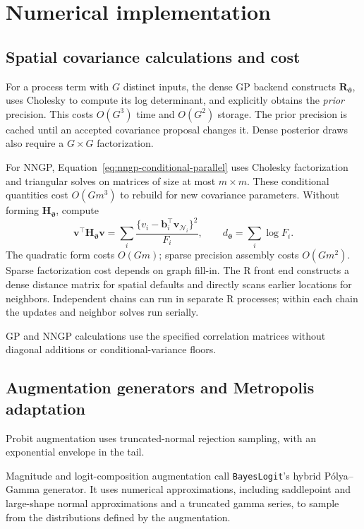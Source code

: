 \documentclass[11pt]{article}
\newcommand{\bb}{\bm{b}}
\newcommand{\bv}{\bm{v}}
\newcommand{\bR}{\bm{R}}
\newcommand{\bH}{\bm{H}}
\newcommand{\trans}{^\top}
\begin{document}
\section{Numerical implementation}
\label{sec:numerical-sampling}

\subsection{Spatial covariance calculations and cost}

For a process term with \(G\) distinct inputs, the dense GP backend
constructs \(\bR_{\boldsymbol\vartheta}\), uses Cholesky to compute its
log determinant, and explicitly obtains the \emph{prior} precision.
This costs \(O(G^3)\) time and \(O(G^2)\) storage.
The prior precision is cached until an accepted covariance proposal changes it.
Dense posterior draws also require a \(G\times G\) factorization.

For NNGP, Equation~\ref{eq:nngp-conditional-parallel} uses Cholesky
factorization and triangular solves on matrices of size at most
\(m\times m\). These conditional quantities cost \(O(Gm^3)\) to rebuild
for new covariance parameters. Without forming \(\bH_{\boldsymbol\vartheta}\), compute
\begin{equation}
 \bv\trans\bH_{\boldsymbol\vartheta}\bv
   =\sum_i\frac{\{v_i-\bb_i\trans\bv_{\mathcal N_i}\}^2}{F_i},
 \qquad d_{\boldsymbol\vartheta}=\sum_i\log F_i.
 \label{eq:nngp-quadratic-form}
\end{equation}
The quadratic form costs \(O(Gm)\); sparse precision assembly costs
\(O(Gm^2)\). Sparse factorization cost depends on graph fill-in.
The R front end constructs
a dense distance matrix for spatial defaults and directly scans earlier
locations for neighbors. Independent chains can run in separate R processes;
within each chain the updates and neighbor solves run serially.

GP and NNGP calculations use the specified correlation matrices without
diagonal additions or conditional-variance floors.

\subsection{Augmentation generators and Metropolis adaptation}

Probit augmentation uses truncated-normal
rejection sampling, with an exponential envelope in the tail.

Magnitude and logit-composition augmentation call \texttt{BayesLogit}'s hybrid
P\'olya--Gamma generator. It uses numerical approximations, including
saddlepoint and large-shape normal approximations and a truncated gamma
series, to sample from the distributions defined by the augmentation.
\end{document}
